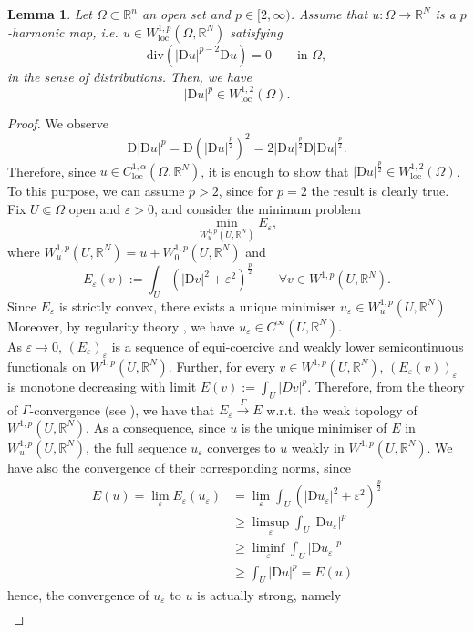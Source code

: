\documentclass[a4paper,11pt]{article}
\numberwithin{equation}{section}
\newtheorem{Lemma}[Theorem]{Lemma}
\newcommand{\numberset}{\mathbb}
\newcommand{\eps}{\varepsilon}
\newcommand{\Om}{\Omega}
\newcommand{\R}{\numberset{R}}
\newcommand{\rom}{\mathrm}
\theoremstyle{definition}
\begin{document}
\begin{Lemma}
Let $\Om\subset\R^n$ an open set and $p\in[2,\infty)$. Assume that $u:\Om\to\R^N$ is a $p$-harmonic map, i.e. $u\in W^{1,p}_{\mathrm{loc}}(\Om,\R^N)$ satisfying
$$
\mathrm{div} (|\rom Du|^{p-2}\rom Du)=0\qquad\mbox{in }\Om,
$$
in the sense of distributions. Then, we have
$$
|\rom Du|^p\in W^{1,2}_{\mathrm{loc}}(\Om).
$$
\end{Lemma}
\begin{proof}
We observe
$$
\rom D|\rom Du|^p=\rom D(|\rom Du|^\frac p2)^2=2|\rom Du|^\frac p2 \rom D|\rom Du|^\frac p2.
$$
Therefore, since $u\in C^{1,\alpha}_\mathrm{loc}(\Om,\R^N)$, it is enough to show that $|\rom Du|^\frac p2\in W^{1,2}_{\mathrm{loc}}(\Om)$.\\
To this purpose, we can assume $p>2$, since for $p=2$ the result is clearly true.\\
Fix $U\Subset\Om$ open and $\eps>0$, and consider the minimum problem
$$
\min_{W^{1,p}_u(U,\R^N)}E_\eps,
$$  
where $W^{1,p}_u(U,\R^N)=u+W^{1,p}_0(U,\R^N)$ and
$$
E_\eps(v):=\int_U\left(|\mathrm Dv|^2+\eps^2\right)^{\frac p2}\qquad\forall v\in W^{1,p}(U,\R^N).
$$
Since $E_\eps$ is strictly convex, there exists a unique minimiser $u_\eps\in W^{1,p}_u(U,\R^N)$. Moreover, by regularity theory \cite{U}, we have $u_\eps\in C^\infty(U,\R^N)$.\\
As $\eps\to0$, $(E_\eps)_\eps$ is a sequence of equi-coercive and weakly lower semicontinuous functionals on $W^{1,p}(U,\R^N)$. Further, for every $v\in W^{1,p}(U,\R^N)$, $(E_\eps(v))_\eps$ is monotone decreasing with limit $E(v):=\int_U|Dv|^p$. Therefore, from the theory of $\Gamma$-convergence (see \cite[Section 2.4]{Br}), we have that
 $E_\eps\stackrel\Gamma\to E$ w.r.t. the weak topology of $W^{1,p}(U,\R^N)$. As a consequence, since $u$ is the unique minimiser of $E$ in $W^{1,p}_u(U,\R^N)$, the full sequence $u_\eps$ converges to $u$ weakly in $W^{1,p}(U,\R^N)$. We have also the convergence of their corresponding norms, since
\begin{align*}
E(u)=\lim_\eps E_\eps(u_\eps)&=\lim_\eps\int_U\left(|\mathrm Du_\eps|^2+\eps^2\right)^{\frac p2}\\
&\geq\limsup_\eps\int_U|\mathrm Du_\eps|^p\\
&\geq\liminf_\eps\int_U|\mathrm Du_\eps|^p\\
&\geq\int_U|\mathrm Du|^p=E(u)
\end{align*}
hence, the convergence of $u_\eps$ to $u$ is actually strong, namely
\begin{align}\label{strong conv}

\end{align}
\end{proof}
\end{document}
